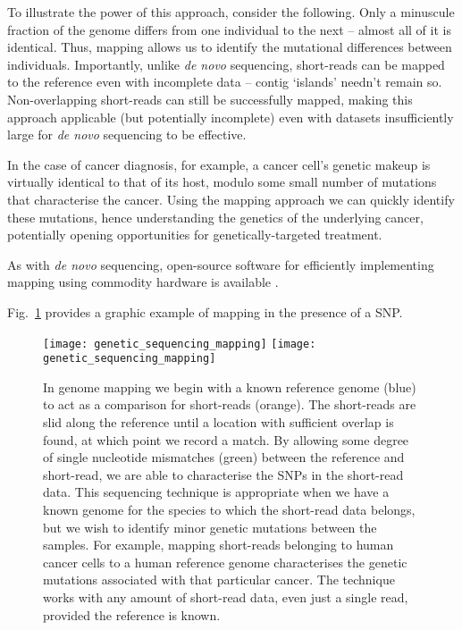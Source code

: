 To illustrate the power of this approach, consider the following. Only a minuscule fraction of the genome differs from one individual to the next -- almost all of it is identical. Thus, mapping allows us to identify the mutational differences between individuals. Importantly, unlike \textit{de novo} sequencing, short-reads can be mapped to the reference even with incomplete data -- contig `islands' needn't remain so. Non-overlapping short-reads can still be successfully mapped, making this approach applicable (but potentially incomplete) even with datasets insufficiently large for \textit{de novo} sequencing to be effective.

In the case of cancer diagnosis, for example, a cancer cell's genetic makeup is virtually identical to that of its host, modulo some small number of mutations that characterise the cancer. Using the mapping approach we can quickly identify these mutations, hence understanding the genetics of the underlying cancer, potentially opening opportunities for genetically-targeted treatment.

As with \textit{de novo} sequencing, open-source software for efficiently implementing mapping using commodity hardware is available \cite{Bfast etc}.

Fig.~\ref{fig:gen_seq_mapping} provides a graphic example of mapping in the presence of a SNP.

\begin{figure}[!htbp]
\pubmode
	\texttt{[image: genetic\_sequencing\_mapping]}
\else
	\texttt{[image: genetic\_sequencing\_mapping]}
\fi
	\captionspacefig \caption{In genome mapping we begin with a known reference genome (blue) to act as a comparison for short-reads (orange). The short-reads are slid along the reference until a location with sufficient overlap is found, at which point we record a match. By allowing some degree of single nucleotide mismatches (green) between the reference and short-read, we are able to characterise the SNPs in the short-read data. This sequencing technique is appropriate when we have a known genome for the species to which the short-read data belongs, but we wish to identify minor genetic mutations between the samples. For example, mapping short-reads belonging to human cancer cells to a human reference genome characterises the genetic mutations associated with that particular cancer. The technique works with any amount of short-read data, even just a single read, provided the reference is known.} \label{fig:gen_seq_mapping}
\end{figure}

